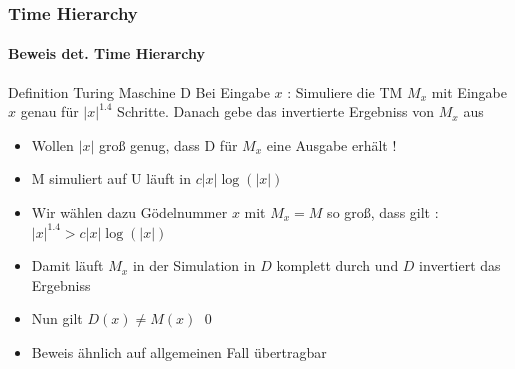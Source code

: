 \begin{frame}
	\frametitle{Time Hierarchy}
	\framesubtitle{Beweis det. Time Hierarchy}
	\begin{KITinfoblock}{Definition Turing Maschine D} 
		Bei Eingabe $x$ : Simuliere die TM $M_x$ mit Eingabe $x$ genau für $|x|^{1.4}$
		 Schritte. Danach gebe das invertierte Ergebniss von $M_x$	aus			
	\end{KITinfoblock}
	
	\begin{itemize}[<+->]
		\item Wollen $|x|$ groß genug, dass D für $M_x$ eine Ausgabe erhält !
		\item M simuliert auf U läuft in $c|x|\log(|x|)$
		\item Wir wählen dazu Gödelnummer $x$ mit $M_x = M$ so groß, dass gilt :
			$|x|^{1.4} > c|x|\log(|x|)$		
		\item Damit läuft $M_x$ in der Simulation in $D$ komplett durch und $D$ invertiert
			das Ergebniss
		\item Nun gilt $D(x) \neq M(x)$ 	\qed 
		\item Beweis ähnlich auf allgemeinen Fall übertragbar
	\end{itemize}
\end{frame}
